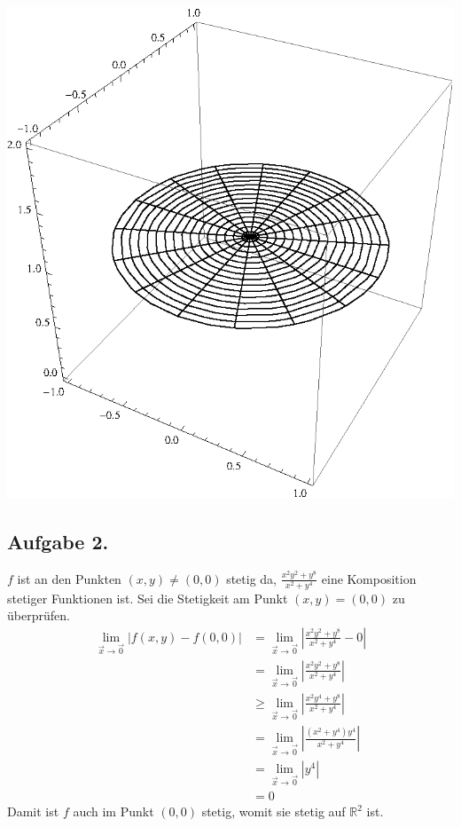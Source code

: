 \documentclass[10pt,a4paper]{scrartcl}
\newcommand{\R}{\mathbb{R}}
\begin{document}
\begin{enumerate}[(i)]
\begin{minipage}{0.50\columnwidth}
$\qquad$\includegraphics[scale=0.7]{1iv2.eps} 
\end{minipage}
\end{enumerate}
\subsection*{Aufgabe 2.}
$f$ ist an den Punkten $(x,y) \neq (0,0)$ stetig da, $\frac{x^2y^2+y^8}{x^2+y^4}$ eine Komposition stetiger Funktionen ist. Sei die Stetigkeit am Punkt $(x,y) = (0,0)$ zu überprüfen.
\begin{align*}
\lim_{\vec{x} \to \vec{0}} \left| f(x,y) - f(0,0) \right| &= \lim_{\vec{x} \to \vec{0}} \left| \frac{x^2y^2+y^8}{x^2+y^4} - 0 \right| \\
 &= \lim_{\vec{x} \to \vec{0}} \left| \frac{x^2y^2+y^8}{x^2+y^4}\right| \\
 &\geq \lim_{\vec{x} \to \vec{0}} \left| \frac{x^2y^4+y^8}{x^2+y^4}\right| \\
 &= \lim_{\vec{x} \to \vec{0}} \left| \frac{(x^2+y^4)y^4}{x^2+y^4}\right| \\
 &=  \lim_{\vec{x} \to \vec{0}} \left| y^4 \right| \\
 &= 0
\end{align*}
Damit ist $f$ auch im Punkt $(0,0)$ stetig, womit sie stetig auf $\R^2$ ist. \\
\end{document}
